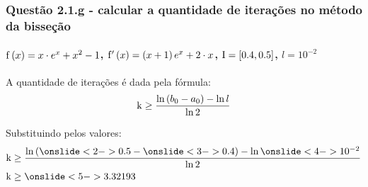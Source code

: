 \begin{frame}
\frametitle{Questão 2.1.g - calcular a quantidade de iterações no método da
bisseção}
\framesubtitle{$\mathrm{f}\left(x\right) = x \cdot e^x + x^2 - 1$, 
$\mathrm{f}'\left(x\right) = \left(x + 1\right)e^x + 2 \cdot x$, $\mathrm{I} =
[0.4,0.5]$, $l = 10^{-2}$}

A quantidade de iterações é dada pela fórmula:
\[
\mathrm{k} \geq \frac{\operatorname{\mathrm{ln}}\left(b_0 - a_0\right) - \operatorname{\mathrm{ln}} l}{\operatorname{\mathrm{ln}} 2}
\]

Substituindo pelos valores:
\begin{align*}
\k &\geq \frac{\ln\left(\onslide<2->{0.5} - \onslide<3->{0.4}\right) - \ln
\onslide<4->{10^{-2}}}{\ln 2}\\
\k &\geq \onslide<5->{3.32193}
\end{align*}


\end{frame}

